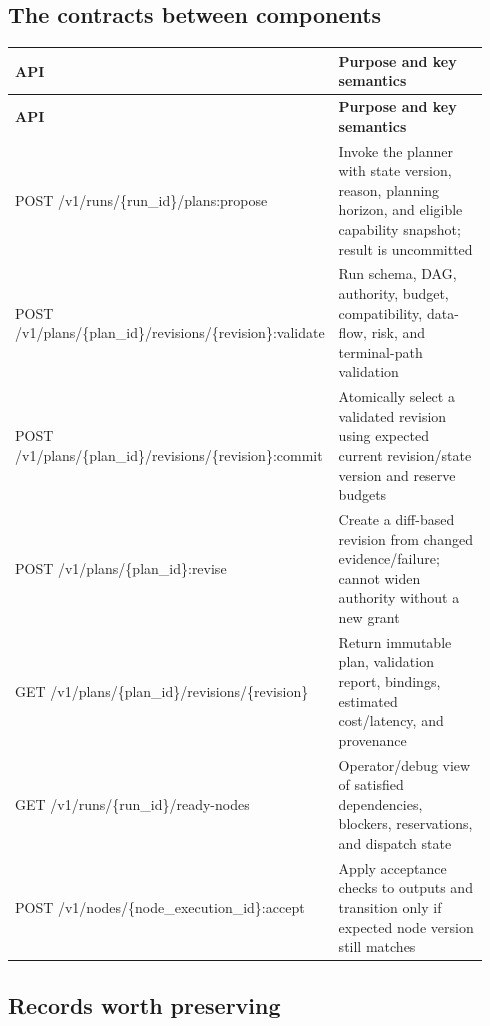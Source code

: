 \subsection{The contracts between components}

\BookTableStart
\small
\begin{longtable}{@{}Y{0.4700\linewidth}Y{0.4700\linewidth}@{}}
\color{white}\bfseries \textbf{API} & \color{white}\bfseries \textbf{Purpose and key semantics} \\
\endfirsthead
{}
\color{white}\bfseries \textbf{API} & \color{white}\bfseries \textbf{Purpose and key semantics} \\
\endhead
POST /v1/runs/\{run\_id\}/plans:propose & Invoke the planner with state version, reason, planning horizon, and eligible capability snapshot; result is uncommitted \\
POST /v1/plans/\{plan\_id\}/revisions/\{revision\}:validate & Run schema, DAG, authority, budget, compatibility, data-flow, risk, and terminal-path validation \\
POST /v1/plans/\{plan\_id\}/revisions/\{revision\}:commit & Atomically select a validated revision using expected current revision/state version and reserve budgets \\
POST /v1/plans/\{plan\_id\}:revise & Create a diff-based revision from changed evidence/failure; cannot widen authority without a new grant \\
GET /v1/plans/\{plan\_id\}/revisions/\{revision\} & Return immutable plan, validation report, bindings, estimated cost/latency, and provenance \\
GET /v1/runs/\{run\_id\}/ready-nodes & Operator/debug view of satisfied dependencies, blockers, reservations, and dispatch state \\
POST /v1/nodes/\{node\_execution\_id\}:accept & Apply acceptance checks to outputs and transition only if expected node version still matches \\
\end{longtable}
\BookTableEnd

\subsection{Records worth preserving}

